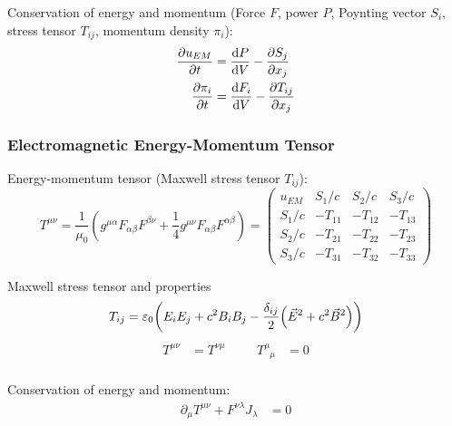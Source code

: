 			\noindent
			Conservation of energy and momentum (Force $F$, power $P$, Poynting vector $S_i$, stress tensor $T_{ij}$, momentum density $\pi_i$):
			\begin{equation}
				\begin{aligned}
					\pdv{u_{EM}}{t} &= \dv{P}{V} - \pdv{S_j}{x_j} \\
					\pdv{\pi_i}{t} &=	\dv{F_i}{V} - \pdv{T_{ij}}{x_j}
				\end{aligned}
			\end{equation}

		\subsubsection{Electromagnetic Energy-Momentum Tensor}
			\noindent
			Energy-momentum tensor (Maxwell stress tensor $T_{ij}$):
			\begin{equation}
				T^{\mu\nu} = \frac{1}{\mu_0}\left(g^{\mu\alpha} F_{\alpha\beta} F^{\beta\nu} +\frac{1}{4}g^{\mu\nu} F_{\alpha\beta} F^{\alpha\beta} \right)
				= \left( \begin{matrix}
					u_{EM} & S_1/c & S_2/c & S_3/c \\
					S_1/c & -T_{11} & -T_{12} & -T_{13} \\
					S_2/c	& -T_{21} & -T_{22} & -T_{23} \\
					S_3/c & -T_{31} & -T_{32} & -T_{33}
				\end{matrix} \right)
			\end{equation}

			\noindent
			Maxwell stress tensor and properties
			\begin{equation}
				T_{ij} = \varepsilon_0 \qty( E_i E_j + c^2 B_i B_j - \frac{\delta_{ij}}{2}\qty(\vec{E}^2 + c^2 \vec{B}^2 ) )
			\end{equation}
			\begin{equation}
				\begin{aligned}
					T^{\mu\nu} &= T^{\nu\mu} &\hspace{20pt}
					T^\mu_{\phantom{\mu}\mu} &= 0 \\
				\end{aligned}
			\end{equation}

			\noindent
			Conservation of energy and momentum:
			\begin{equation}
				\begin{aligned}
					\partial_\mu T^{\mu\nu} + F^{\nu\lambda} J_\lambda &= 0
				\end{aligned}
			\end{equation}


